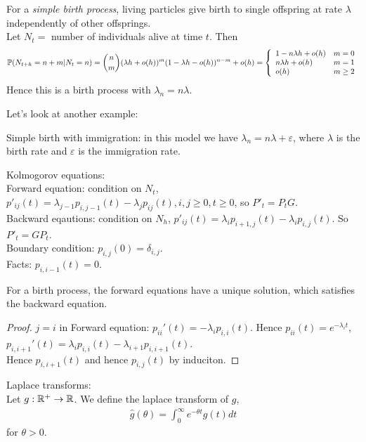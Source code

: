 \documentclass[a4paper]{article}
\begin{document}
For a \emph{simple birth process}, living particles give birth to single offspring at rate $\lambda$ independently of other offsprings.\\
Let $N_t =$ number of individuals alive at time $t$. Then
\begin{equation*}
\begin{aligned}
\P(N_{t+h} = n+m | N_t = n) = {n \choose m} (\lambda h+o(h))^m (1-\lambda h -o(h) )^{n-m} + o(h) = \left\{\begin{array}{ll}
1-n\lambda h + o(h) & m=0\\
n\lambda h + o(h) & m=1\\
o(h) & m \geq 2
\end{array}
\right.
\end{aligned}
\end{equation*}
Hence this is a birth process with $\lambda_n = n\lambda$.

Let's look at another example:

\begin{eg}
Simple birth with immigration: in this model we have $\lambda_n = n\lambda + \varepsilon$, where $\lambda$ is the birth rate and $\varepsilon$ is the immigration rate.

Kolmogorov equations:\\
Forward equation: condition on $N_t$, $p'_{ij}(t) = \lambda_{j-1} p_{i,j-1}(t) - \lambda_j p_{ij}(t), i,j \geq 0, t \geq 0$, so $P'_t = P_t G$.\\
Backward eqautions: condition on $N_h$, $p'_{ij}(t) = \lambda_i p_{i+1,j}(t) - \lambda_i p_{i,j}(t)$. So $P'_t = GP_t$.\\
Boundary condition: $p_{i,j}(0) = \delta_{i,j}$.\\
Facts: $p_{i,i-1}(t) = 0$.
\end{eg}

\begin{thm}
For a birth process, the forward equations have a unique solution, which satisfies the backward equation.
\begin{proof}
$j=i$ in Forward equation: $p_{ii}'(t) = -\lambda_i p_{i,i}(t)$. Hence $p_{ii}(t) = e^{-\lambda_i t}$,\\
$p_{i,i+1}'(t) = \lambda_i p_{i,i}(t) - \lambda_{i+1} p_{i,i+1}(t)$.\\
Hence $p_{i,i+1}(t)$ and hence $p_{i,j}(t)$ by induciton.
\end{proof}
\end{thm}

Laplace transforms:\\
Let $g:\R^+ \to \R$. We define the laplace transform of $g$,
\begin{equation*}
\begin{aligned}
\hat{g}(\theta) = \int_0^\infty e^{-\theta t} g(t) dt
\end{aligned}
\end{equation*}
for $\theta > 0$.
\end{document}
